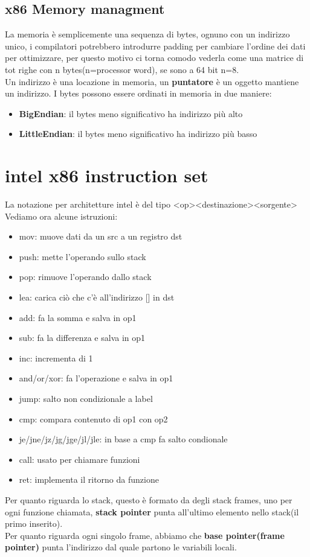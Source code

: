 \documentclass[oneside,a4paper,11pt]{book}
\theoremstyle{italicstyle}
\theoremstyle{normStyle}
\begin{document}
\subsection{x86 Memory managment}
La memoria è semplicemente una sequenza di bytes, ognuno con un indirizzo unico, i compilatori potrebbero introdurre padding per cambiare l'ordine dei dati per ottimizzare, per questo motivo ci torna comodo vederla come una matrice di tot righe con n bytes(n=processor word), se sono a 64 bit n=8.\\
Un indirizzo è una locazione in memoria, un \textbf{puntatore} è un oggetto mantiene un indirizzo.
I bytes possono essere ordinati in memoria in due maniere:
\begin{itemize}
\item \textbf{BigEndian}: il bytes meno significativo ha indirizzo più alto
\item \textbf{LittleEndian}: il bytes meno significativo ha indirizzo più basso
\end{itemize}
\section{intel x86 instruction set}
La notazione per architetture intel è del tipo \textless op\textgreater\textless destinazione\textgreater\textless sorgente\textgreater\\
Vediamo ora alcune istruzioni:
\begin{itemize}
\item mov: muove dati da un src a un registro dst
\item push: mette l'operando sullo stack
\item pop: rimuove l'operando dallo stack
\item lea: carica ciò che c'è all'indirizzo [] in dst
\item add: fa la somma e salva in op1
\item sub: fa la differenza e salva in op1
\item inc: incrementa di 1
\item and/or/xor: fa l'operazione e salva in op1
\item jump: salto non condizionale a label
\item cmp: compara contenuto di op1 con op2
\item je/jne/jz/jg/jge/jl/jle: in base a cmp fa salto condionale 
\item call: usato per chiamare funzioni
\item ret: implementa il ritorno da funzione
\end{itemize}
Per quanto riguarda lo stack, questo è formato da degli stack frames, uno per ogni funzione chiamata, \textbf{stack pointer} punta all'ultimo elemento nello stack(il primo inserito).\\
Per quanto riguarda ogni singolo frame, abbiamo che \textbf{base pointer(frame pointer)} punta l'indirizzo dal quale partono le variabili locali.
\end{document}
